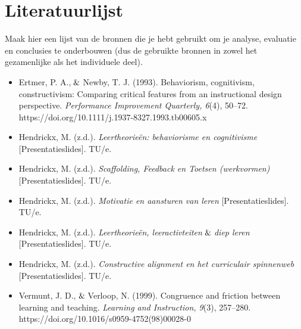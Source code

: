 \documentclass{article}
\begin{document}
    \section{Literatuurlijst}
        Maak hier een lijst van de bronnen die je hebt gebruikt om je analyse, evaluatie en conclusies te onderbouwen (dus de gebruikte bronnen in zowel het gezamenlijke als het individuele deel).
        \begin{itemize}
            \item Ertmer, P. A.,$\And$Newby, T. J. (1993). Behaviorism, cognitivism, constructivism: Comparing critical features from an instructional design perspective. \textit{Performance Improvement Quarterly, 6}(4), 50–72. https://doi.org/10.1111/j.1937-8327.1993.tb00605.x
            \item Hendrickx, M. (z.d.). \textit{Leertheorieën: behaviorisme en cognitivisme} [Presentatieslides]. TU/e.
            \item Hendrickx, M. (z.d.). \textit{Scaffolding, Feedback en Toetsen (werkvormen)} [Presentatieslides]. TU/e.
            \item Hendrickx, M. (z.d.). \textit{Motivatie en aansturen van leren} [Presentatieslides]. TU/e.
            \item Hendrickx, M. (z.d.). \textit{Leertheorieën, leeractivteiten$\And$diep leren} [Presentatieslides]. TU/e.
            \item Hendrickx, M. (z.d.). \textit{Constructive alignment en het curriculair spinnenweb} [Presentatieslides]. TU/e.
            \item Vermunt, J. D.,$\And$Verloop, N. (1999). Congruence and friction between learning and teaching. \textit{Learning and Instruction, 9}(3), 257–280. https://doi.org/10.1016/s0959-4752(98)00028-0
        \end{itemize}

\end{document}
